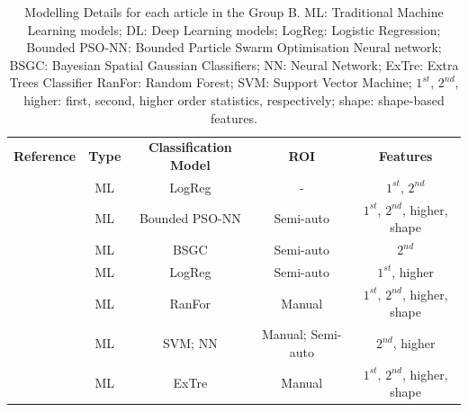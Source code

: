 \documentclass{article}
\begin{document}
\begin{table}[]
    \centering
    \begin{tabular}{ccccc}\toprule
        \multirow{2}{*}{\textbf{Reference}} & \multirow{2}{*}{\textbf{Type}} & \multirow{2}{*}{\textbf{Classification Model}} & \multirow{2}{*}{\textbf{ROI}} & \multirow{2}{*}{\textbf{Features}} \\
        \\ \midrule
        \cite{Shoemaker2018}                & ML                             & LogReg                                         & -                             & $1^{st}$, $2^{nd}$                 \\
        \cite{Koyuncu2019}                  & ML                             & Bounded PSO-NN                                 & Semi-auto                     & $1^{st}$, $2^{nd}$, higher, shape  \\
        \cite{Li2019}                       & ML                             & BSGC                                           & Semi-auto                     & $2^{nd}$                           \\
        \cite{Andersen2021}                 & ML                             & LogReg                                         & Semi-auto                     & $1^{st}$, higher                   \\
        \cite{Moawad2021}                   & ML                             & RanFor                                         & Manual                        & $1^{st}$, $2^{nd}$, higher, shape  \\
        \cite{Barstugan2020}                & ML                             & SVM; NN                                        & Manual; Semi-auto             & $2^{nd}$, higher                   \\
        \cite{Stanzione2021}                & ML                             & ExTre                                          & Manual                        & $1^{st}$, $2^{nd}$, higher, shape  \\
        \bottomrule
    \end{tabular}
    \caption{Modelling Details for each article in the Group B. ML: Traditional Machine Learning models; DL: Deep Learning models; LogReg: Logistic Regression;
        Bounded PSO-NN: Bounded Particle Swarm Optimisation Neural network; BSGC: Bayesian Spatial Gaussian Classifiers; NN: Neural Network; ExTre: Extra Trees Classifier
        RanFor: Random Forest; SVM: Support Vector Machine; $1^{st}$, $2^{nd}$, higher: first, second, higher order statistics, respectively; shape: shape-based features.}
    \label{tab:model_B}
\end{table}
\end{document}
